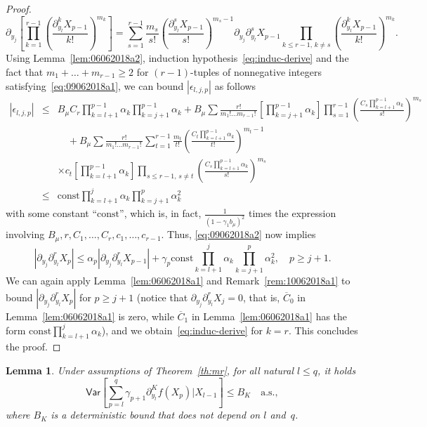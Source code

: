 \documentclass[article]{elsarticle}
\newtheorem{lem}[thm]{Lemma}
\newcommand*{\const}{\mathrm{const}}
\newcommand*{\ol}{\overline}
\begin{document}
\begin{proof}
\[
\partial_{y_{j}}\left[\prod_{k=1}^{r-1}\left(\frac{\partial_{y_{l}}^{k}X_{p-1}}{k!}\right)^{m_{k}}\right]=\sum_{s=1}^{r-1}\frac{m_{s}}{s!}\left(\frac{\partial_{y_{l}}^{s}X_{p-1}}{s!}\right)^{m_{s}-1}\partial_{y_{j}}\partial_{y_{l}}^{s}X_{p-1}\prod_{k\le r-1,\,k\neq s}\left(\frac{\partial_{y_{l}}^{k}X_{p-1}}{k!}\right)^{m_{k}}.
\]
Using Lemma~\ref{lem:06062018a2},
induction hypothesis~\eqref{eq:induc-derive}
and the fact that $m_{1}+\ldots+m_{r-1}\ge2$
for $(r-1)$-tuples of nonnegative integers
satisfying~\eqref{eq:09062018a1},
we can bound $|\epsilon_{l,j,p}|$ as follows
\begin{eqnarray*}
\left|\epsilon_{l,j,p}\right| & \leq & B_{\mu}C_{r}\prod_{k=l+1}^{p-1}\alpha_{k}\prod_{k=j+1}^{p-1}\alpha_{k}+B_{\mu}\sum\frac{r!}{m_{1}!\ldots m_{r-1}!\,}\left[\prod_{k=j+1}^{p-1}\alpha_{k}\right]\prod_{s=1}^{r-1}\left(\frac{C_{s}\prod_{k=l+1}^{p-1}\alpha_{k}}{s!}\right)^{m_{s}}\\
 &&\hspace{1em}+B_{\mu}\sum\frac{r!}{m_{1}!\ldots m_{r-1}!\,}\sum_{t=1}^{r-1}\frac{m_t}{t!}\left(\frac{C_{t}\prod_{k=l+1}^{p-1}\alpha_{k}}{t!}\right)^{m_{t}-1}
 \\
 && \times c_t\left[\prod_{k=l+1}^{p-1}\alpha_{k}\right]\prod_{s\le r-1,\,s\neq t}\left(\frac{C_{s}\prod_{k=l+1}^{p-1}\alpha_{k}}{s!}\right)^{m_{s}}\\
 & \leq &\const\prod_{k=l+1}^{j}\alpha_{k}\prod_{k=j+1}^{p}\alpha_{k}^{2}
\end{eqnarray*}
with some constant ``$\const$'',
which is, in fact, $\frac1{(1-\gamma_1 b_\mu)^2}$ times
the expression involving
$B_\mu,r,C_1,\ldots,C_r,c_1,\ldots,c_{r-1}$.
Thus, \eqref{eq:09062018a2} now implies
$$
|\partial_{y_{j}}\partial_{y_{l}}^{r}X_{p}|
\le\alpha_p|\partial_{y_{j}}\partial_{y_{l}}^{r}X_{p-1}|
+\gamma_p \const\prod_{k=l+1}^{j}\alpha_{k}\prod_{k=j+1}^{p}\alpha_{k}^{2},
\quad p\ge j+1.
$$
We can again apply Lemma~\ref{lem:06062018a1}
and Remark~\ref{rem:10062018a1}
to bound $|\partial_{y_{j}}\partial_{y_{l}}^r X_{p}|$
for $p\ge j+1$
(notice that $\partial_{y_j}\partial_{y_l}^r X_j=0$, that is,
$\ol C_0$ in Lemma~\ref{lem:06062018a1} is zero,
while $\ol C_1$ in Lemma~\ref{lem:06062018a1}
has the form $\const\prod_{k=l+1}^j \alpha_k$),
and we obtain~\eqref{eq:induc-derive} for $k=r$.
This concludes the proof.
\end{proof}

\begin{lem}
\label{lem:var_poincare}
Under assumptions of Theorem~\ref{th:mr},
for all natural $l\le q$, it holds
$$
\mathsf{Var}\left[\sum_{p=l}^{q}\gamma_{p+1}\partial_{y_{l}}^{K}f\left(X_{p}\right)\Big|X_{l-1}\right]\le B_K\quad\text{a.s.},
$$
where $B_K$ is a deterministic bound that does not depend on $l$ and~$q$.
\end{lem}
\end{document}
